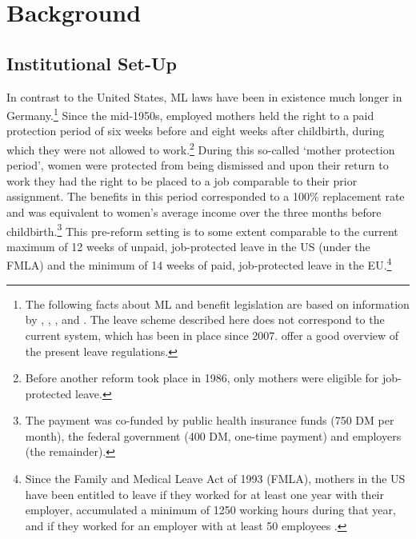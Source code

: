 \bigskip
\section{Background}\label{sec_mlch:background}
\subsection[Reform]{Institutional Set-Up}
In contrast to the United States, ML laws have been in existence much longer in Germany.\footnote{The following facts about ML and benefit legislation are based on information by \cite{DIW2002}, \cite{schonberg2014expansions}, \cite{Dustmann2012}, and \cite{zmarzlik1999mutterschutzgesetz}. The leave scheme described here does not correspond to the current system, which has been in place since 2007. \cite{Kluve2013} offer a good overview of the present leave regulations.} Since the mid-1950s, employed mothers held the right to a paid protection period of six weeks before and eight weeks after childbirth, during which they were not allowed to work.\footnote{Before another reform took place in 1986, only mothers were eligible for job-protected leave.} During this so-called `mother protection period', women were protected from being dismissed and upon their return to work they had the right to be placed
to a job comparable to their prior assignment. The benefits in this period corresponded to a 100\% replacement rate and was equivalent to women's average income over the three months before childbirth.\footnote{The payment was co-funded by public health insurance funds (750 DM per month), the federal government (400 DM, one-time payment) and employers (the remainder).} This pre-reform setting is to some extent comparable to the current maximum of 12 weeks of unpaid, job-protected leave in the US (under the FMLA) and the minimum of 14 weeks of paid, job-protected leave in the EU.\footnote{Since the Family and Medical Leave Act of 1993 (FMLA), mothers in the US have been entitled to leave if they worked for at least one year with their employer, accumulated a minimum of 1250 working hours during that year, and if they worked for an employer with at least 50 employees \citep{baum2003effect}.} 

